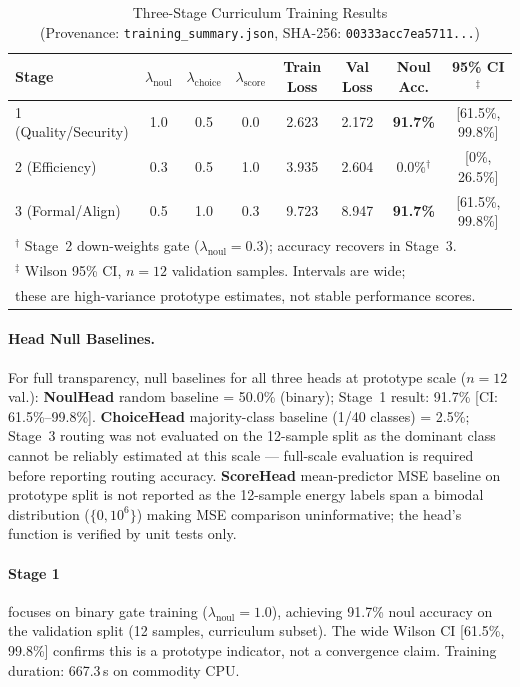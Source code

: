 \documentclass[conference]{IEEEtran}
\begin{document}
\begin{table}[htbp]
\centering
\caption{Three-Stage Curriculum Training Results\\
(Provenance: \texttt{training\_summary.json}, SHA-256: \texttt{00333acc7ea5711...})}
\label{tab:training}
\begin{tabular}{@{}lccccccc@{}}
\toprule
\textbf{Stage} & $\lambda_\text{noul}$ & $\lambda_\text{choice}$ & $\lambda_\text{score}$
               & \textbf{Train Loss} & \textbf{Val Loss} & \textbf{Noul Acc.} & \textbf{95\% CI$^{\ddagger}$} \\
\midrule
1 (Quality/Security) & 1.0 & 0.5 & 0.0 & 2.623 & 2.172 & \textbf{91.7\%} & [61.5\%, 99.8\%] \\
2 (Efficiency)       & 0.3 & 0.5 & 1.0 & 3.935 & 2.604 & 0.0\%$^\dagger$ & [0\%, 26.5\%] \\
3 (Formal/Align)     & 0.5 & 1.0 & 0.3 & 9.723 & 8.947 & \textbf{91.7\%} & [61.5\%, 99.8\%] \\
\midrule
\multicolumn{8}{l}{$^\dagger$ Stage~2 down-weights gate ($\lambda_\text{noul}{=}0.3$);
  accuracy recovers in Stage~3.} \\
\multicolumn{8}{l}{$^\ddagger$ Wilson 95\% CI, $n{=}12$ validation samples. Intervals are wide;} \\
\multicolumn{8}{l}{\quad these are high-variance prototype estimates, not stable performance scores.} \\
\bottomrule
\end{tabular}
\end{table}

\paragraph{Head Null Baselines.}
For full transparency, null baselines for all three heads at prototype scale ($n{=}12$ val.):
\textbf{NoulHead} random baseline = 50.0\% (binary); Stage~1 result: 91.7\% [CI: 61.5\%--99.8\%].
\textbf{ChoiceHead} majority-class baseline (1/40 classes) = 2.5\%; Stage~3 routing
was not evaluated on the 12-sample split as the dominant class cannot be reliably
estimated at this scale — full-scale evaluation is required before reporting routing accuracy.
\textbf{ScoreHead} mean-predictor MSE baseline on prototype split is not reported
as the 12-sample energy labels span a bimodal distribution ($\{0, 10^6\}$) making
MSE comparison uninformative; the head's function is verified by unit tests only.

\paragraph{Stage 1} focuses on binary gate training ($\lambda_\text{noul}{=}1.0$),
achieving 91.7\% noul accuracy on the validation split (12 samples, curriculum subset).
The wide Wilson CI [61.5\%, 99.8\%] confirms this is a prototype indicator, not a
convergence claim. Training duration: 667.3\,s on commodity CPU.
\end{document}
